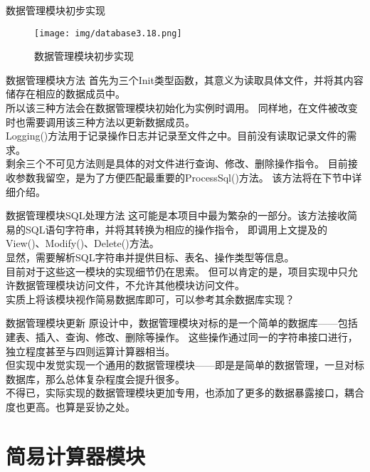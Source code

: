 \documentclass[10pt]{beamer}
\begin{document}
\begin{frame}{数据管理模块初步实现}
    \begin{figure}[H]
        \centering
        \texttt{[image: img/database3.18.png]}
        \caption{数据管理模块初步实现}
        \label{database3.18}
    \end{figure}
\end{frame}

\begin{frame}{数据管理模块方法}
    首先为三个Init类型函数，其意义为读取具体文件，并将其内容储存在相应的数据成员中。\\
    所以该三种方法会在数据管理模块初始化为实例时调用。
    同样地，在文件被改变时也需要调用该三种方法以更新数据成员。\\
    Logging()方法用于记录操作日志并记录至文件之中。目前没有读取记录文件的需求。\\
    剩余三个不可见方法则是具体的对文件进行查询、修改、删除操作指令。
    目前接收参数我留空，是为了方便匹配最重要的ProcessSql()方法。
    该方法将在下节中详细介绍。\\
\end{frame}

\begin{frame}{数据管理模块SQL处理方法}
    这可能是本项目中最为繁杂的一部分。该方法接收简易的SQL语句字符串，并将其转换为相应的操作指令，
    即调用上文提及的View()、Modify()、Delete()方法。\\
    显然，需要解析SQL字符串并提供目标、表名、操作类型等信息。\\
    目前对于这些这一模块的实现细节仍在思索。
    但可以肯定的是，项目实现中只允许数据管理模块访问文件，不允许其他模块访问文件。\\
    实质上将该模块视作简易数据库即可，可以参考其余数据库实现？
\end{frame}

\begin{frame}{数据管理模块更新}
    原设计中，数据管理模块对标的是一个简单的数据库——包括建表、插入、查询、修改、删除等操作。
    这些操作通过同一的字符串接口进行，独立程度甚至与四则运算计算器相当。\\
    但实现中发觉实现一个通用的数据管理模块——即是是简单的数据管理，一旦对标数据库，那么总体复杂程度会提升很多。\\
    不得已，实际实现的数据管理模块更加专用，也添加了更多的数据暴露接口，耦合度也更高。也算是妥协之处。
\end{frame}

\section{简易计算器模块}
\end{document}
